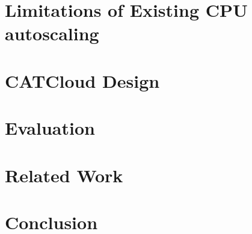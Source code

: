 \documentclass[tocnosub,noragright,centerchapter,fullpagesingle,12pt]{uiuc_csthesis21}
\theoremstyle{definition}
\numberwithin{algocf}{chapter}     %
\begin{document}
\chapter{Limitations of Existing CPU autoscaling}
\label{chp:limits}


\chapter{CATCloud Design}
\label{chp:design}


\chapter{Evaluation}
\label{chp:evaluation}


\chapter{Related Work}
\label{chp:related}


\chapter{Conclusion}
\label{chp:conclusion}



\end{document}
